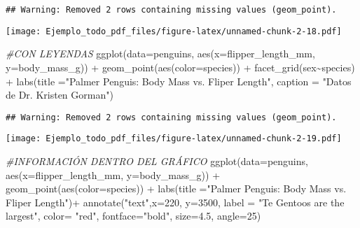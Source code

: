 \documentclass[
]{article}
\newenvironment{Shaded}{\begin{snugshade}}{\end{snugshade}}
\newcommand{\AttributeTok}[1]{\textcolor[rgb]{0.77,0.63,0.00}{#1}}
\newcommand{\CommentTok}[1]{\textcolor[rgb]{0.56,0.35,0.01}{\textit{#1}}}
\newcommand{\DecValTok}[1]{\textcolor[rgb]{0.00,0.00,0.81}{#1}}
\newcommand{\FloatTok}[1]{\textcolor[rgb]{0.00,0.00,0.81}{#1}}
\newcommand{\FunctionTok}[1]{\textcolor[rgb]{0.00,0.00,0.00}{#1}}
\newcommand{\NormalTok}[1]{#1}
\newcommand{\SpecialCharTok}[1]{\textcolor[rgb]{0.00,0.00,0.00}{#1}}
\newcommand{\StringTok}[1]{\textcolor[rgb]{0.31,0.60,0.02}{#1}}
\begin{document}
\begin{verbatim}
## Warning: Removed 2 rows containing missing values (geom_point).
\end{verbatim}

\texttt{[image: Ejemplo\_todo\_pdf\_files/figure-latex/unnamed-chunk-2-18.pdf]}

\begin{Shaded}
\begin{Highlighting}[]
\CommentTok{\#CON LEYENDAS}
\FunctionTok{ggplot}\NormalTok{(}\AttributeTok{data=}\NormalTok{penguins, }\FunctionTok{aes}\NormalTok{(}\AttributeTok{x=}\NormalTok{flipper\_length\_mm, }\AttributeTok{y=}\NormalTok{body\_mass\_g)) }\SpecialCharTok{+}
  \FunctionTok{geom\_point}\NormalTok{(}\FunctionTok{aes}\NormalTok{(}\AttributeTok{color=}\NormalTok{species)) }\SpecialCharTok{+} \FunctionTok{facet\_grid}\NormalTok{(sex}\SpecialCharTok{\textasciitilde{}}\NormalTok{species) }\SpecialCharTok{+}
  \FunctionTok{labs}\NormalTok{(}\AttributeTok{title =}\StringTok{"Palmer Penguis: Body Mass vs. Fliper Length"}\NormalTok{, }\AttributeTok{caption =} \StringTok{"Datos de Dr. Kristen Gorman"}\NormalTok{)}
\end{Highlighting}
\end{Shaded}

\begin{verbatim}
## Warning: Removed 2 rows containing missing values (geom_point).
\end{verbatim}

\texttt{[image: Ejemplo\_todo\_pdf\_files/figure-latex/unnamed-chunk-2-19.pdf]}

\begin{Shaded}
\begin{Highlighting}[]
\CommentTok{\#INFORMACIÓN DENTRO DEL GRÁFICO}
\FunctionTok{ggplot}\NormalTok{(}\AttributeTok{data=}\NormalTok{penguins, }\FunctionTok{aes}\NormalTok{(}\AttributeTok{x=}\NormalTok{flipper\_length\_mm, }\AttributeTok{y=}\NormalTok{body\_mass\_g)) }\SpecialCharTok{+}
  \FunctionTok{geom\_point}\NormalTok{(}\FunctionTok{aes}\NormalTok{(}\AttributeTok{color=}\NormalTok{species)) }\SpecialCharTok{+}
  \FunctionTok{labs}\NormalTok{(}\AttributeTok{title =}\StringTok{"Palmer Penguis: Body Mass vs. Fliper Length"}\NormalTok{)}\SpecialCharTok{+}
  \FunctionTok{annotate}\NormalTok{(}\StringTok{"text"}\NormalTok{,}\AttributeTok{x=}\DecValTok{220}\NormalTok{, }\AttributeTok{y=}\DecValTok{3500}\NormalTok{, }\AttributeTok{label =} \StringTok{"Te Gentoos are the largest"}\NormalTok{, }\AttributeTok{color=} \StringTok{"red"}\NormalTok{, }\AttributeTok{fontface=}\StringTok{"bold"}\NormalTok{, }\AttributeTok{size=}\FloatTok{4.5}\NormalTok{, }\AttributeTok{angle=}\DecValTok{25}\NormalTok{)}
\end{Highlighting}
\end{Shaded}
\end{document}

